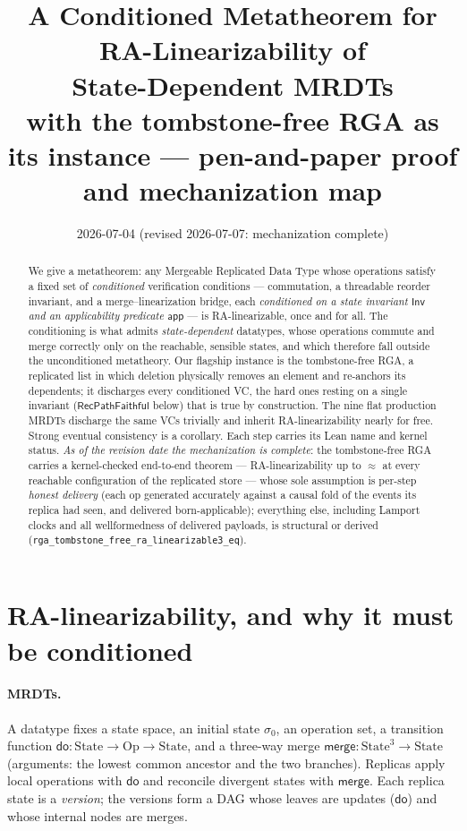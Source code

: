 \documentclass[11pt]{article}
\title{A Conditioned Metatheorem for RA-Linearizability of\\
State-Dependent MRDTs\\[3pt]
\large with the tombstone-free RGA as its instance --- pen-and-paper proof and
mechanization map}
\author{}
\date{2026-07-04 (revised 2026-07-07: mechanization complete)}
\theoremstyle{definition}
\theoremstyle{remark}
\newcommand{\st}{\sigma}
\newcommand{\ini}{\st_0}
\newcommand{\dodo}{\mathsf{do}}
\newcommand{\merge}{\mathsf{merge}}
\newcommand{\eqobs}{\approx}
\newcommand{\Inv}{\mathsf{Inv}}
\newcommand{\app}{\mathsf{app}}
\newcommand{\RVF}{\textsf{RecPathFaithful}}
\newcommand{\lean}[1]{\texttt{#1}}
\begin{document}
\maketitle

\begin{abstract}
We give a metatheorem: any Mergeable Replicated Data Type whose operations satisfy a
fixed set of \emph{conditioned} verification conditions --- commutation, a threadable
reorder invariant, and a merge--linearization bridge, each \emph{conditioned on a state
invariant $\Inv$ and an applicability predicate $\app$} --- is RA-linearizable, once and
for all. The conditioning is what admits \emph{state-dependent} datatypes, whose operations
commute and merge correctly only on the reachable, sensible states, and which therefore
fall outside the unconditioned metatheory. Our flagship instance is the tombstone-free RGA,
a replicated list in which deletion physically removes an element and re-anchors its
dependents; it discharges every conditioned VC, the hard ones resting on a single invariant
($\RVF$ below) that is true by construction. The nine flat production MRDTs discharge the
same VCs trivially and inherit RA-linearizability nearly for free. Strong eventual
consistency is a corollary. Each step carries its Lean name and kernel status. \emph{As of
the revision date the mechanization is complete}: the tombstone-free RGA carries a
kernel-checked end-to-end theorem --- RA-linearizability up to $\eqobs$ at every reachable
configuration of the replicated store --- whose sole assumption is per-step \emph{honest
delivery} (each op generated accurately against a causal fold of the events its replica had
seen, and delivered born-applicable); everything else, including Lamport clocks and all
wellformedness of delivered payloads, is structural or derived
(\lean{rga\_tombstone\_free\_ra\_linearizable3\_eq}).
\end{abstract}

\section{RA-linearizability, and why it must be conditioned}\label{sec:setting}

\paragraph{MRDTs.} A datatype fixes a state space, an initial state $\ini$, an operation
set, a transition function $\dodo : \text{State} \to \text{Op} \to \text{State}$, and a
three-way merge $\merge : \text{State}^3 \to \text{State}$ (arguments: the lowest common
ancestor and the two branches). Replicas apply local operations with $\dodo$ and reconcile
divergent states with $\merge$. Each replica state is a \emph{version}; the versions form a
DAG whose leaves are updates ($\dodo$) and whose internal nodes are merges.
\end{document}
